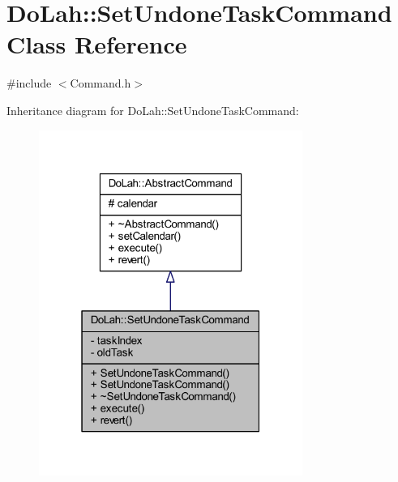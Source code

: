 \hypertarget{class_do_lah_1_1_set_undone_task_command}{}\section{Do\+Lah\+:\+:Set\+Undone\+Task\+Command Class Reference}
\label{class_do_lah_1_1_set_undone_task_command}


{\ttfamily \#include $<$Command.\+h$>$}



Inheritance diagram for Do\+Lah\+:\+:Set\+Undone\+Task\+Command\+:\nopagebreak
\begin{figure}[H]
\begin{center}
\leavevmode
\includegraphics[width=244pt]{class_do_lah_1_1_set_undone_task_command__inherit__graph}
\end{center}
\end{figure}


